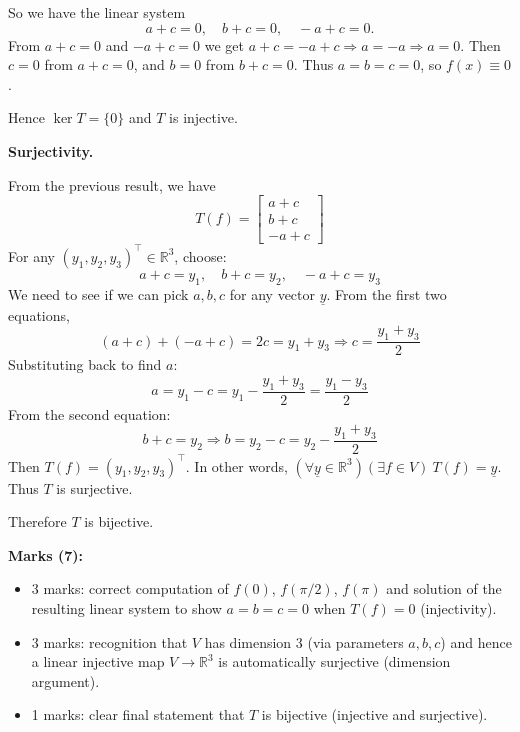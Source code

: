 \documentclass{article}
\begin{document}
\begin{enumerate}[label=(\alph*)]
\begin{mdframed}[linecolor=black, linewidth=1pt]
    So we have the linear system
    \[
    a + c = 0,\quad
    b + c = 0,\quad
    -a + c = 0.
    \]
    From $a+c=0$ and $-a+c=0$ we get $a+c = -a+c \Rightarrow a=-a \Rightarrow a=0$. Then $c=0$ from $a+c=0$, and $b=0$ from $b+c=0$. Thus $a=b=c=0$, so $f(x)\equiv0$.
    
    Hence $\ker T = \{0\}$ and $T$ is injective.
    
    \medskip
    \textbf{Surjectivity.}

    From the previous result, we have
    \[
    T(f) = \left[ \begin{array}{c}
        a+c \\ b+c \\ -a+c
    \end{array} \right]
    \]
    For any $(y_1,y_2,y_3)^\top \in \mathbb{R}^3$, choose:
    \[
    a+c = y_1, \quad b+c= y_2, \quad -a+c = y_3
    \]
    We need to see if we can pick $a,b,c$ for any vector $\underline{y}$. From the first two equations,
    \[
    (a+c)+(-a+c)=2c=y_1+y_3 \Rightarrow c = \frac{y_1+y_3}{2}
    \]
    Substituting back to find $a$:
    \[
    a = y_1 - c = y_1 - \frac{y_1+y_3}{2} = \frac{y_1-y_3}{2}
    \]
    From the second equation:
    \[
    b+c = y_2 \Rightarrow b = y_2 - c = y_2 - \frac{y_1+y_3}{2}
    \]
    Then $T(f)=(y_1,y_2,y_3)^\top$. In other words, $(\forall \underline{y} \in \mathbb{R}^3)(\exists f \in V) \ T(f) = \underline{y}$.
    Thus $T$ is surjective.
    
    \medskip
    Therefore $T$ is bijective.
    
    \textbf{Marks (7):}
    \begin{itemize}
      \item 3 marks: correct computation of $f(0)$, $f(\pi/2)$, $f(\pi)$ and solution of the resulting linear system to show $a=b=c=0$ when $T(f)=0$ (injectivity).
      \item 3 marks: recognition that $V$ has dimension $3$ (via parameters $a,b,c$) and hence a linear injective map $V\to\mathbb{R}^3$ is automatically surjective (dimension argument).
      \item 1 marks: clear final statement that $T$ is bijective (injective and surjective).
    \end{itemize}
    
    \end{mdframed}
    

\end{enumerate}
\end{document}
